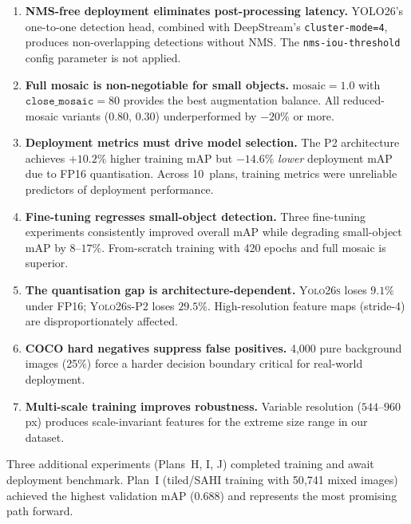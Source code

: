 \documentclass[12pt, titlepage]{article}
\begin{document}
\begin{enumerate}[leftmargin=*]
  \item \textbf{NMS-free deployment eliminates post-processing latency.}
        YOLO26's one-to-one detection head, combined with DeepStream's
        \texttt{cluster-mode=4}, produces non-overlapping detections
        without NMS.  The \texttt{nms-iou-threshold} config parameter
        is not applied.

  \item \textbf{Full mosaic is non-negotiable for small objects.}
        $\text{mosaic} = 1.0$ with $\texttt{close\_mosaic} = 80$
        provides the best augmentation balance.  All reduced-mosaic
        variants ($0.80$, $0.30$) underperformed by $-20\%$ or more.

  \item \textbf{Deployment metrics must drive model selection.}  The P2
        architecture achieves $+10.2\%$ higher training mAP but $-14.6\%$
        \emph{lower} deployment mAP due to FP16 quantisation.  Across
        10~plans, training metrics were unreliable predictors of
        deployment performance.

  \item \textbf{Fine-tuning regresses small-object detection.}
        Three fine-tuning experiments consistently improved overall mAP
        while degrading small-object mAP by $8$--$17\%$.  From-scratch
        training with 420 epochs and full mosaic is superior.

  \item \textbf{The quantisation gap is architecture-dependent.}
        \textsc{Yolo26s} loses $9.1\%$ under FP16; \textsc{Yolo26s-P2}
        loses $29.5\%$.  High-resolution feature maps (stride-4) are
        disproportionately affected.

  \item \textbf{COCO hard negatives suppress false positives.}
        4{,}000 pure background images (25\%) force a harder decision
        boundary critical for real-world deployment.

  \item \textbf{Multi-scale training improves robustness.}  Variable
        resolution ($544$--$960$\,px) produces scale-invariant features
        for the extreme size range in our dataset.
\end{enumerate}

\noindent Three additional experiments (Plans~H, I, J) completed training
and await deployment benchmark.  Plan~I (tiled/SAHI training with
50{,}741 mixed images) achieved the highest validation mAP ($0.688$) and
represents the most promising path forward.
\end{document}
